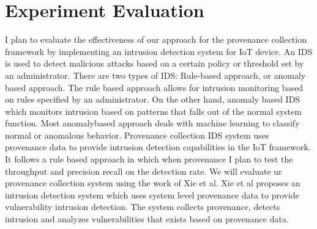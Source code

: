 \section{Experiment Evaluation}

I plan to evaluate the effectiveness of our approach for the provenance collection framework by implementing an intrusion detection system for IoT device. An IDS is used to detect malicious attacks based on a certain policy or threshold set by an administrator. There are two types of  IDS: Rule-based approach, or anomaly based approach. The rule based approach allows for intrusion monitoring based on rules specified by an administrator. On the other hand, anomaly based IDS which monitors intrusion based on patterns that falls out of the normal system function. Most anomaly\-based approach deals with machine learning to classify normal or anomalous behavior. Provenance collection IDS system uses provenance data to provide intrusion detection capabilities in the IoT framework. It follows a rule based approach in which when provenance  I plan to test the throughput and precision recall on the detection rate. We will evaluate ur provenance collection system using the work of Xie et al. Xie et al proposes an intrusion detection system which uses system level provenance data to provide vulnerability intrusion detection. The system collects provenance, detects intrusion and analyzes vulnerabilities that exists based on provenance data.  


%
